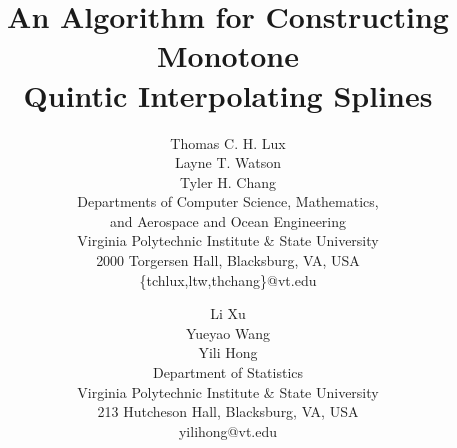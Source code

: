\documentclass{scspaperproc}
\theoremstyle{scsthe}
\begin{document}
%



\def\SCSconferenceacro{SpringSim'20}

\def\SCSpublicationyear{2020}

\def\SCSconferencedates{May 19-May 21}

\def\SCSconferencevenue{Fairfax, VA, USA}

\title{An Algorithm for Constructing Monotone \\ Quintic Interpolating Splines}

\author{
Thomas C. H. Lux\\
Layne T. Watson\\
Tyler H. Chang\\ [12pt]
Departments of Computer Science, Mathematics,\\
and Aerospace and Ocean Engineering\\
Virginia Polytechnic Institute \& State University\\
2000 Torgersen Hall, Blacksburg, VA, USA\\
\{tchlux,ltw,thchang\}@vt.edu\\
\and
Li Xu\\%
Yueyao Wang\\%
Yili Hong\\ [12pt]
Department of Statistics\\
Virginia Polytechnic Institute \& State University\\
213 Hutcheson Hall, Blacksburg, VA, USA\\
yilihong@vt.edu\\
}
\end{document}
